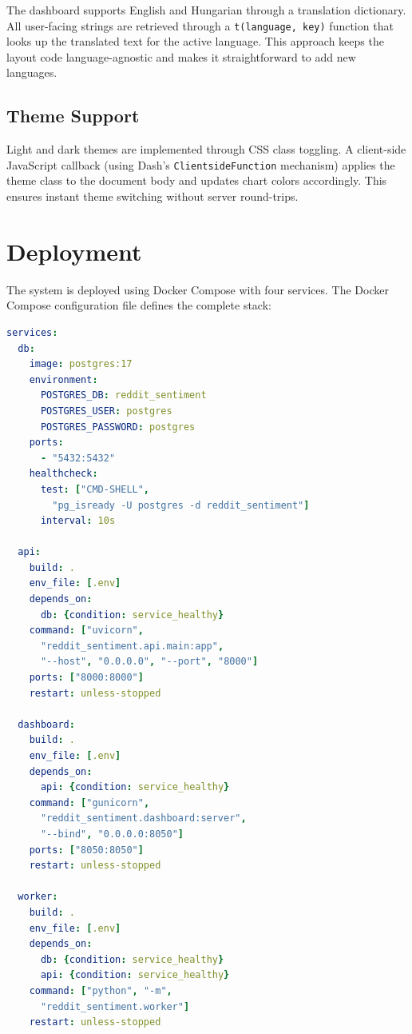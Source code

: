 The dashboard supports English and Hungarian through a translation dictionary. All user-facing strings are retrieved through a \texttt{t(language, key)} function that looks up the translated text for the active language. This approach keeps the layout code language-agnostic and makes it straightforward to add new languages.

\subsection{Theme Support}

Light and dark themes are implemented through CSS class toggling. A client-side JavaScript callback (using Dash's \texttt{ClientsideFunction} mechanism) applies the theme class to the document body and updates chart colors accordingly. This ensures instant theme switching without server round-trips.

\section{Deployment}
\label{sec:deployment}

The system is deployed using Docker Compose with four services. The Docker Compose configuration file defines the complete stack:

\begin{lstlisting}[language=yaml, caption={Docker Compose service definitions}]
services:
  db:
    image: postgres:17
    environment:
      POSTGRES_DB: reddit_sentiment
      POSTGRES_USER: postgres
      POSTGRES_PASSWORD: postgres
    ports:
      - "5432:5432"
    healthcheck:
      test: ["CMD-SHELL",
        "pg_isready -U postgres -d reddit_sentiment"]
      interval: 10s

  api:
    build: .
    env_file: [.env]
    depends_on:
      db: {condition: service_healthy}
    command: ["uvicorn",
      "reddit_sentiment.api.main:app",
      "--host", "0.0.0.0", "--port", "8000"]
    ports: ["8000:8000"]
    restart: unless-stopped

  dashboard:
    build: .
    env_file: [.env]
    depends_on:
      api: {condition: service_healthy}
    command: ["gunicorn",
      "reddit_sentiment.dashboard:server",
      "--bind", "0.0.0.0:8050"]
    ports: ["8050:8050"]
    restart: unless-stopped

  worker:
    build: .
    env_file: [.env]
    depends_on:
      db: {condition: service_healthy}
      api: {condition: service_healthy}
    command: ["python", "-m",
      "reddit_sentiment.worker"]
    restart: unless-stopped
\end{lstlisting}


